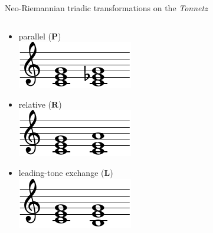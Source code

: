 \begin{frame}[c]{\insertsectionhead}
  Neo-Riemannian \alert{triadic transformations} on the \emph{Tonnetz}~\citep{Cohn1998}
  \begin{columns}
    \begin{column}{.45\textwidth}
      \begin{itemize}
        \item<2-> \textcolor{epfldark}{parallel ($\mathbf{P}$)}\\ \includegraphics{scores/parallel.pdf}
        \item<3-> \textcolor{canard}{relative ($\mathbf{R}$)}\\ \includegraphics{scores/relative.pdf}
        \item<4-> \textcolor{leman}{leading-tone exchange ($\mathbf{L}$)}\\ \includegraphics{scores/leading_tone.pdf}
      \end{itemize}

    \end{column}
    \begin{column}{.65\textwidth}
      
    \end{column}
  \end{columns}
\end{frame}


